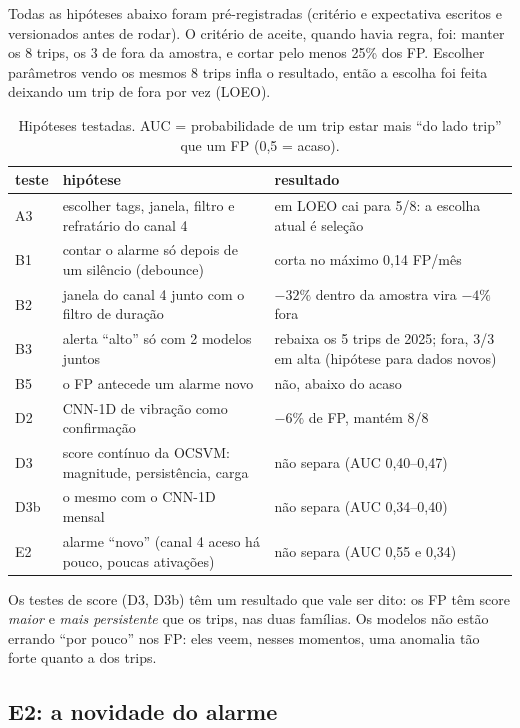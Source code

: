 \documentclass[11pt,a4paper]{article}
\begin{document}
Todas as hipóteses abaixo foram pré-registradas (critério e expectativa escritos e versionados antes de rodar). O
critério de aceite, quando havia regra, foi: manter os 8 trips, os 3 de fora da amostra, e cortar pelo menos 25\% dos
FP. Escolher parâmetros vendo os mesmos 8 trips infla o resultado, então a escolha foi feita deixando um trip de fora
por vez (LOEO).

\begin{table}[H]
\centering\small
\caption{Hipóteses testadas. AUC = probabilidade de um trip estar mais ``do lado trip'' que um FP (0,5 = acaso).}
\begin{tabular}{l >{\raggedright\arraybackslash}p{6.3cm} >{\raggedright\arraybackslash}p{6.8cm}}
\toprule
teste & hipótese & resultado \\
\midrule
A3 & escolher tags, janela, filtro e refratário do canal 4 & em LOEO cai para 5/8: a escolha atual é seleção \\
B1 & contar o alarme só depois de um silêncio (debounce) & corta no máximo 0,14 FP/mês \\
B2 & janela do canal 4 junto com o filtro de duração & $-32\%$ dentro da amostra vira $-4\%$ fora \\
B3 & alerta ``alto'' só com 2 modelos juntos & rebaixa os 5 trips de 2025; fora, 3/3 em alta (hipótese para dados novos) \\
B5 & o FP antecede um alarme novo & não, abaixo do acaso \\
D2 & CNN-1D de vibração como confirmação & $-6\%$ de FP, mantém 8/8 \\
D3 & score contínuo da OCSVM: magnitude, persistência, carga & não separa (AUC 0,40--0,47) \\
D3b & o mesmo com o CNN-1D mensal & não separa (AUC 0,34--0,40) \\
E2 & alarme ``novo'' (canal 4 aceso há pouco, poucas ativações) & não separa (AUC 0,55 e 0,34) \\
\bottomrule
\end{tabular}
\end{table}

Os testes de score (D3, D3b) têm um resultado que vale ser dito: os FP têm score \emph{maior} e \emph{mais
persistente} que os trips, nas duas famílias. Os modelos não estão errando ``por pouco'' nos FP: eles veem, nesses
momentos, uma anomalia tão forte quanto a dos trips.

\subsection{E2: a novidade do alarme}
\end{document}
